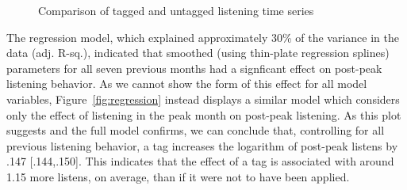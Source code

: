   \begin{figure}
    \hfill
    \caption{Comparison of tagged and untagged listening time series}
    \label{fig:regressionFigs}
  \end{figure}

The regression model, which explained approximately 30\% of the variance in the data (adj. R-sq.), indicated that smoothed (using thin-plate regression splines) parameters for all seven previous months had a signficant effect on post-peak listening behavior. As we cannot show the form of this effect for all model variables, Figure~\ref{fig:regression} instead displays a similar model which considers only the effect of listening in the peak month on post-peak listening. As this plot suggests and the full model confirms, we can conclude that, controlling for all previous listening behavior, a tag increases the logarithm of post-peak listens by .147 [.144,.150]. This indicates that the effect of a tag is associated with around 1.15 more listens, on average, than if it were not to have been applied.   

